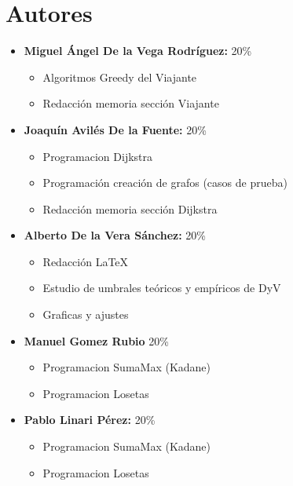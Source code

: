 \documentclass[11pt,openany]{book}
\begin{document}
\tableofcontents %
\newpage %


\chapter{Autores}
\begin{itemize}
      \item \textbf{Miguel Ángel De la Vega Rodríguez:} 20\%
            \begin{itemize}
                  \item Algoritmos Greedy del Viajante
                  \item Redacción memoria sección Viajante
            \end{itemize}
      \item \textbf{Joaquín Avilés De la Fuente:} 20\%
            \begin{itemize}
                  \item Programacion Dijkstra
                  \item Programación creación de grafos (casos de prueba)
                  \item Redacción memoria sección Dijkstra
            \end{itemize}
      \item \textbf{Alberto De la Vera Sánchez: } 20\%
            \begin{itemize}
                  \item Redacción \LaTeX
                  \item Estudio de umbrales teóricos y empíricos de DyV
                  \item Graficas y ajustes
            \end{itemize}
      \item \textbf{Manuel Gomez Rubio} 20\%
            \begin{itemize}
                  \item Programacion SumaMax (Kadane)
                  \item Programacion Losetas
            \end{itemize}
      \item \textbf{Pablo Linari Pérez:} 20\%
            \begin{itemize}
                  \item Programacion SumaMax (Kadane)
                  \item Programacion Losetas
            \end{itemize}
\end{itemize}
\end{document}
